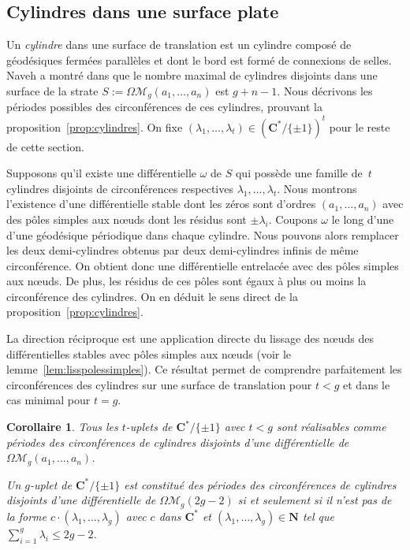 \documentclass[JEP,XML,SOM,Unicode,francais,NoFloatCountersInSection,published]{cedram}
\let\mathcal\mathscr
\newcommand{\CC}{\mathbf{C}}
\newcommand{\NN}{\mathbf{N}}
\newcommand{\omoduli}[1][g]{{\Omega\mathcal M}_{\!#1}}
\newtheorem{cor}[thm]{Corollaire}
\theoremstyle{definition}
\begin{document}
\subsection{Cylindres dans une surface plate}
\label{sec:cylindres}
Un \emph{cylindre} dans une surface de translation est un cylindre composé de géodésiques fermées parallèles et dont le bord est formé de connexions de selles.
Naveh a montré dans \cite{Na} que le nombre maximal de cylindres disjoints dans une surface de la strate $S:=\omoduli(a_{1},\dots,a_{n})$ est $g+n-1$.
Nous décrivons les périodes possibles des circonférences de ces cylindres, prouvant la proposition~\ref{prop:cylindres}. On fixe $(\lambda_{1},\dots,\lambda_{t})\in (\CC^{\ast}/\{\pm1\})^{t}$ pour le reste de cette section.
\par
Supposons qu'il existe une différentielle $\omega$ de $S$ qui possède une famille de~$t$ cylindres disjoints de circonférences respectives $\lambda_{1},\dots,\lambda_{t}$. Nous montrons l'existence d'une différentielle stable dont les zéros sont d'ordres $(a_{1},\dots,a_{n})$ avec des pôles simples aux nœuds dont les résidus sont $\pm \lambda_{i}$. Coupons $\omega$ le long d'une d'une géodésique périodique dans chaque cylindre. Nous pouvons alors remplacer les deux demi-cylindres obtenus par deux demi-cylindres infinis de même circonférence. On obtient donc une différentielle entrelacée avec des pôles simples aux nœuds. De plus, les résidus de ces pôles sont égaux à plus ou moins la circonférence des cylindres. On en déduit le sens direct de la proposition~\ref{prop:cylindres}.
\par
La direction réciproque est une application directe du lissage des nœuds des différentielles stables avec pôles simples aux nœuds (voir le lemme~\ref{lem:lisspolessimples}).
Ce résultat permet de comprendre parfaitement les circonférences des cylindres sur une surface de translation pour $t <g$ et dans le cas minimal pour $t=g$.
\begin{cor}\label{cor:cylindres}
Tous les $t$-uplets de $\CC^{\ast}/\{\pm1\}$ avec $t < g$ sont réalisables comme périodes des circonférences de cylindres disjoints d'une différentielle de $\omoduli(a_{1},\dots,a_{n})$.

Un $g$-uplet de $\CC^{\ast}/\{\pm1\}$ est constitué des périodes des circonférences de cylindres disjoints d'une différentielle de $\omoduli(2g-2)$ si et seulement si il n'est pas de la forme $c \cdot (\lambda_{1},\dots, \lambda_{g})$ avec $c$ dans $\CC^{\ast}$ et $(\lambda_{1},\dots,\lambda_{g})\in \NN$ tel que $\sum_{i=1}^{g} \lambda_{i} \leq 2g-2$.
\end{cor}
\end{document}
